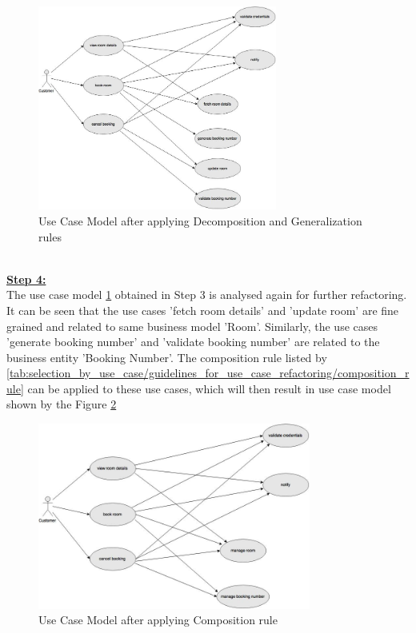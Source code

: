 \\
\begin{figure}[H]
\begin{center}
\includegraphics[width=0.7\textwidth]{figures/use-case-three}
\caption{Use Case Model after applying Decomposition and Generalization rules}
\label{fig:selection_by_use_case/use_case_three}
\end{center}
\end{figure}
\\
\textbf{\underline{Step 4:}}
\\
The use case model \ref{fig:selection_by_use_case/use_case_three} obtained in Step 3 is analysed again for further refactoring. It can be seen that the use cases 'fetch room details' and 'update room' are fine grained and related to same business model 'Room'. Similarly, the use cases 'generate booking number' and 'validate booking number' are related to the business entity 'Booking Number'. The composition rule listed by \ref{tab:selection_by_use_case/guidelines_for_use_case_refactoring/composition_rule} can be applied to these use cases, which will then result in use case model shown by the Figure \ref{fig:selection_by_use_case/use_case_four}
\\
\begin{figure}[H]
\begin{center}
\includegraphics[width=0.8\textwidth]{figures/use-case-four}
\caption{Use Case Model after applying Composition rule}
\label{fig:selection_by_use_case/use_case_four}
\end{center}
\end{figure}
